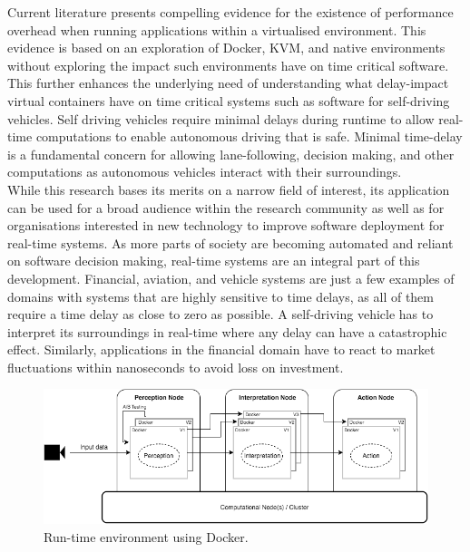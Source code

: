 Current literature \cite{vmvscontainers} presents compelling evidence for the existence of performance overhead when running applications within a virtualised environment. This evidence is based on an exploration of Docker, KVM, and native environments without exploring the impact such environments have on time critical software. This further enhances the underlying need of understanding what delay-impact virtual containers have on time critical systems such as software for self-driving vehicles. Self driving vehicles require minimal delays during runtime to allow real-time computations to enable autonomous driving that is safe. Minimal time-delay is a fundamental concern for allowing lane-following, decision making, and other computations as autonomous vehicles interact with their surroundings.\\

While this research bases its merits on a narrow field of interest, its application can be used for a broad audience within the research community as well as for organisations interested in new technology to improve software deployment for real-time systems. As more parts of society are becoming automated and reliant on software decision making, real-time systems are an integral part of this development. Financial, aviation, and vehicle systems are just a few examples of domains with systems that are highly sensitive to time delays, as all of them require a time delay as close to zero as possible. A self-driving vehicle has to interpret its surroundings in real-time where any delay can have a catastrophic effect. Similarly, applications in the financial domain have to react to market fluctuations within nanoseconds to avoid loss on investment. \\

\begin{figure}[ht]
\centering
     \includegraphics[width=1.0\textwidth]{./figure/containers.png}
      \caption{Run-time environment using Docker.}
       \label{containers}
\end{figure}


